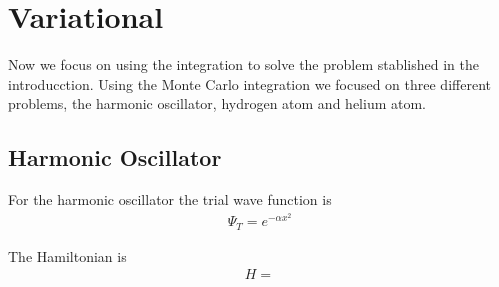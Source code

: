 
\section{Variational}
 Now we focus on using the integration to solve the problem stablished in the introducction.
 Using the Monte Carlo integration we focused on three different problems, the harmonic oscillator,
 hydrogen atom and helium atom.

\subsection{Harmonic Oscillator}
  For the harmonic oscillator the trial wave function is
  \begin{align}
    \Psi_T = e^{-\alpha x^2}
  \end{align}

  The Hamiltonian is
  \begin{align}
    H =
  \end{align}
